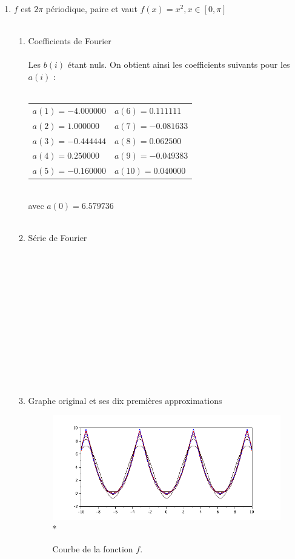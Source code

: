 \documentclass[a4paper,12pt]{report}
\begin{document}
\begin{enumerate}
		\item $f$ est $2\pi$ périodique, paire et vaut $f(x)=x^{2}, x \in [0,\pi]$ \\ \\
		\begin{enumerate}
			\item Coefficients de Fourier \\ \\
			Les $b(i)$ étant nuls. On obtient ainsi les coefficients suivants pour les $a(i)$ : \\ \\
			\begin{tabular}{l l}
				$a(1) = -4.000000$ & \hspace*{2cm}$a(6) = 0.111111$\\
				$a(2) = 1.000000$ & \hspace*{2cm}$a(7) = -0.081633$\\
				$a(3) = -0.444444$ & \hspace*{2cm}$a(8) = 0.062500$\\
				$a(4) = 0.250000$ & \hspace*{2cm}$a(9) = -0.049383$\\
				$a(5) = -0.160000$ & \hspace*{2cm}$a(10) = 0.040000$\\
			\end{tabular}\\
			avec $a(0) = 6.579736$\\ \\
			\item Série de Fourier \\ \\ \\ \\ \\ \\ \\ \\ \\ \\ \\ \\ \\

			\item Graphe original et ses dix premières approximations
			\begin{figure}[h!]
				\centering
				\includegraphics[scale=0.6]{ex1_fig4_1.png}\\*
				\caption{\label{ex1_figure4_1}Courbe de la fonction $f$.}
			\end{figure}\\
		

\end{enumerate}
\end{enumerate}
\end{document}
